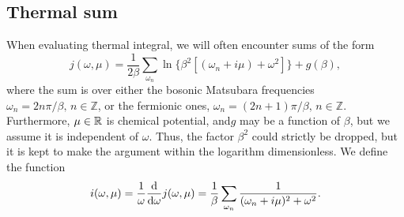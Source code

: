\subsection{Thermal sum}
\label{section: thermal sum}

When evaluating thermal integral, we will often encounter sums of the form
%
\begin{equation}
    \label{j func}
    j(\omega, \mu) = \frac{1}{2\beta} \sum_{\omega_n} 
    \ln\{\beta^2 [(\omega_n + i \mu) + \omega^2] \} + g(\beta),
\end{equation}
%
where the sum is over either the bosonic Matsubara frequencies $\omega_n = 2n \pi / \beta,\, n \in \mathbb{Z}$, or the fermionic ones, $\omega_n = (2n + 1) \pi /\beta ,\, n \in \mathbb{Z}$.
Furthermore, $\mu \in \mathbb{R}$ is chemical potential, and$g$ may be a function of $\beta$, but we assume it is independent of $\omega$.
Thus, the factor $\beta^2$ could strictly be dropped, but it is kept to make the argument within the logarithm dimensionless.
We define the function
%
\begin{equation}
    \label{i func}
    i(\omega, \mu) 
    = \frac{1}{\omega} \odv{}{\omega} j(\omega, \mu) 
    = \frac{1}{\beta} \sum_{\omega_n} \frac{1}{(\omega_n + i\mu)^2 + \omega^2}. 
\end{equation}


